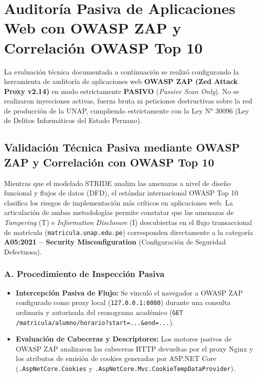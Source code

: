 \clearpage

\section{Auditoría Pasiva de Aplicaciones Web con OWASP ZAP y Correlación OWASP Top 10}

\begin{tcolorbox}[colback=orange!8!white, colframe=orange!85!black, arc=2mm, boxrule=0.9pt, title={\textbf{NOTA METODOLÓGICA DE AUDITORÍA DEFENSIVA}}, fonttitle=\small\sffamily\bfseries, coltitle=white]
La evaluación técnica documentada a continuación se realizó configurando la herramienta de auditoría de aplicaciones web \textbf{OWASP ZAP (Zed Attack Proxy v2.14)} en modo estrictamente \textbf{PASIVO} (\textit{Passive Scan Only}). No se realizaron inyecciones activas, fuerza bruta ni peticiones destructivas sobre la red de producción de la UNAP, cumpliendo estrictamente con la Ley N° 30096 (Ley de Delitos Informáticos del Estado Peruano).
\end{tcolorbox}

\subsection{Validación Técnica Pasiva mediante OWASP ZAP y Correlación con OWASP Top 10}

Mientras que el modelado STRIDE analiza las amenazas a nivel de diseño funcional y flujos de datos (DFD), el estándar internacional OWASP Top 10 clasifica los riesgos de implementación más críticos en aplicaciones web. La articulación de ambas metodologías permite constatar que las amenazas de \textit{Tampering} (T) e \textit{Information Disclosure} (I) descubiertas en el flujo transaccional de matrícula (\texttt{matricula.unap.edu.pe}) corresponden directamente a la categoría \textbf{A05:2021 -- Security Misconfiguration} (Configuración de Seguridad Defectuosa).

\subsubsection{A. Procedimiento de Inspección Pasiva}
\begin{itemize}[itemsep=3pt,topsep=2pt,parsep=0pt]
    \item \textbf{Intercepción Pasiva de Flujo:} Se vinculó el navegador a OWASP ZAP configurado como proxy local (\texttt{127.0.0.1:8080}) durante una consulta ordinaria y autorizada del cronograma académico (\texttt{GET /matricula/alumno/horario?start=...\&end=...}).
    \item \textbf{Evaluación de Cabeceras y Descriptores:} Los motores pasivos de OWASP ZAP analizaron las cabeceras HTTP devueltas por el proxy Nginx y los atributos de emisión de cookies generadas por ASP.NET Core (\texttt{.AspNetCore.\allowbreak Cookies} y \texttt{.AspNetCore.\allowbreak Mvc.\allowbreak CookieTempDataProvider}).
\end{itemize}

